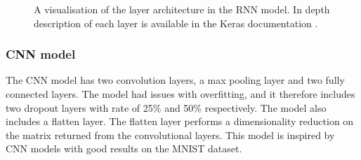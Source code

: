 \begin{figure}[H]
    \caption{A visualisation of the layer architecture in the RNN model. In depth description of each layer is available in the Keras documentation \cite{chollet_keras_2015}.}
    \label{fig:RNN__model_visualization_1}
\end{figure}

\subsubsection{CNN model}

The CNN model has two convolution layers, a max pooling layer and two fully connected layers. The model had issues with overfitting, and it therefore includes two dropout layers with  rate of 25\% and 50\% respectively. The model also includes a flatten layer. The flatten layer performs a dimensionality reduction on the matrix returned from the convolutional layers. This model is inspired by CNN models with good results on the MNIST dataset. \cite{ciresan_multi-column_2012}


